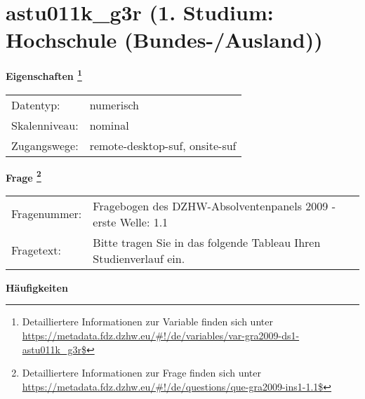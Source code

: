 
    \setcounter{footnote}{0}

    \vspace*{-1.8cm}
	\section{astu011k\_g3r (1. Studium: Hochschule (Bundes-/Ausland))}
	\label{section:astu011k_g3r}



    \vspace*{0.5cm}
    \noindent\textbf{Eigenschaften
	\footnote{Detailliertere Informationen zur Variable finden sich unter
		\url{https://metadata.fdz.dzhw.eu/\#!/de/variables/var-gra2009-ds1-astu011k_g3r$}}}\\
	\begin{tabularx}{\hsize}{@{}lX}
	Datentyp: & numerisch \\
	Skalenniveau: & nominal \\
	Zugangswege: &
	  remote-desktop-suf, 
	  onsite-suf
 \\
    \end{tabularx}



				\vspace*{0.5cm}
                \noindent\textbf{Frage
	                \footnote{Detailliertere Informationen zur Frage finden sich unter
		              \url{https://metadata.fdz.dzhw.eu/\#!/de/questions/que-gra2009-ins1-1.1$}}}\\
				\begin{tabularx}{\hsize}{@{}lX}
					Fragenummer: &
					  Fragebogen des DZHW-Absolventenpanels 2009 - erste Welle:
					  1.1
 \\
					Fragetext: & Bitte tragen Sie in das folgende Tableau Ihren Studienverlauf ein. \\
				\end{tabularx}





        		\vspace*{0.5cm}
                \noindent\textbf{Häufigkeiten}

